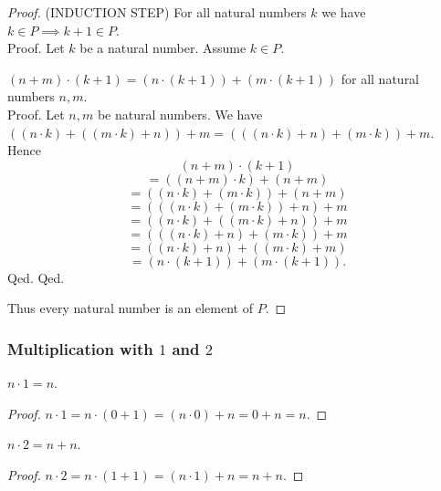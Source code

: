 \documentclass[../../arithmetic.ftl.tex]{subfiles}
\begin{document}
\begin{forthel}
\begin{proof}
      (INDUCTION STEP) For all natural numbers $k$ we have $k \in P \implies k + 1 \in P$. \\
      Proof.
        Let $k$ be a natural number.
        Assume $k \in P$.

        $(n + m) \cdot (k + 1) = (n \cdot (k + 1)) + (m \cdot (k + 1))$ for all
        natural numbers $n,m$. \\
        Proof.
          Let $n,m$ be natural numbers.
          We have $((n \cdot k) + ((m \cdot k) + n)) + m =
          (((n \cdot k) + n) + (m \cdot k)) + m$.
          Hence
          \[ (n + m) \cdot (k + 1) \]
          \[ = ((n + m) \cdot k) + (n + m) \]
          \[ = ((n \cdot k) + (m \cdot k)) + (n + m) \]
          \[ = (((n \cdot k) + (m \cdot k)) + n) + m \]
          \[ = ((n \cdot k) + ((m \cdot k) + n)) + m \]
          \[ = (((n \cdot k) + n) + (m \cdot k)) + m \]
          \[ = ((n \cdot k) + n) + ((m \cdot k) + m) \]
          \[ = (n \cdot (k + 1)) + (m \cdot (k + 1)). \]
        Qed.
      Qed.

      Thus every natural number is an element of $P$.
    \end{proof}
  \end{forthel}


  \subsubsection*{Multiplication with $1$ and $2$}

  \begin{forthel}
    \begin{proposition}\label{Arithmetic_01_03_866630}
      $n \cdot 1 = n$.
    \end{proposition}
    \begin{proof}
      $ n \cdot 1
      = n \cdot (0 + 1)   %
      = (n \cdot 0) + n   %
      = 0 + n             %
      = n$.               %
    \end{proof}


    \begin{corollary}\label{Arithmetic_01_03_302621}
    $n \cdot 2 = n + n$.
    \end{corollary}
    \begin{proof}
      $ n \cdot 2
      = n \cdot (1 + 1)   %
      = (n \cdot 1) + n   %
      = n + n$.           %
    \end{proof}
  \end{forthel}
\end{document}
